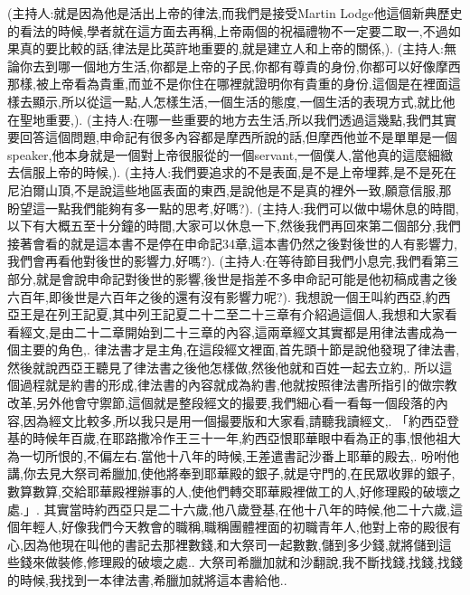 \documentclass{book}
\begin{document}
(主持人:就是因為他是活出上帝的律法,而我們是接受Martin Lodge他這個新典歷史的看法的時候,學者就在這方面去再稱,上帝兩個的祝福禮物不一定要二取一,不過如果真的要比較的話,律法是比英許地重要的,就是建立人和上帝的關係,).
(主持人:無論你去到哪一個地方生活,你都是上帝的子民,你都有尊貴的身份,你都可以好像摩西那樣,被上帝看為貴重,而並不是你住在哪裡就證明你有貴重的身份,這個是在裡面這樣去顯示,所以從這一點,人怎樣生活,一個生活的態度,一個生活的表現方式,就比他在聖地重要,).
(主持人:在哪一些重要的地方去生活,所以我們透過這幾點,我們其實要回答這個問題,申命記有很多內容都是摩西所說的話,但摩西他並不是單單是一個speaker,他本身就是一個對上帝很服從的一個servant,一個僕人,當他真的這麼細緻去信服上帝的時候,).
(主持人:我們要追求的不是表面,是不是上帝埋葬,是不是死在尼泊爾山頂,不是說這些地區表面的東西,是說他是不是真的裡外一致,願意信服,那盼望這一點我們能夠有多一點的思考,好嗎?).
(主持人:我們可以做中場休息的時間,以下有大概五至十分鐘的時間,大家可以休息一下,然後我們再回來第二個部分,我們接著會看的就是這本書不是停在申命記34章,這本書仍然之後對後世的人有影響力,我們會再看他對後世的影響力,好嗎?).
(主持人:在等待節目我們小息完,我們看第三部分,就是會說申命記對後世的影響,後世是指差不多申命記可能是他初稿成書之後六百年,即後世是六百年之後的還有沒有影響力呢?).
我想說一個王叫約西亞,約西亞王是在列王記夏,其中列王記夏二十二至二十三章有介紹過這個人,我想和大家看看經文,是由二十二章開始到二十三章的內容,這兩章經文其實都是用律法書成為一個主要的角色,.
律法書才是主角,在這段經文裡面,首先頭十節是說他發現了律法書,然後就說西亞王聽見了律法書之後他怎樣做,然後他就和百姓一起去立約,.
所以這個過程就是約書的形成,律法書的內容就成為約書,他就按照律法書所指引的做宗教改革,另外他會守禦節,這個就是整段經文的撮要,我們細心看一看每一個段落的內容,因為經文比較多,所以我只是用一個撮要版和大家看,請聽我讀經文,.
「約西亞登基的時候年百歲,在耶路撒冷作王三十一年,約西亞恨耶華眼中看為正的事,恨他祖大為一切所恨的,不偏左右.當他十八年的時候,王差遣書記沙番上耶華的殿去,.
吩咐他講,你去見大祭司希臘加,使他將奉到耶華殿的銀子,就是守門的,在民眾收罪的銀子,數算數算,交給耶華殿裡辦事的人,使他們轉交耶華殿裡做工的人,好修理殿的破壞之處.」.
其實當時約西亞只是二十六歲,他八歲登基,在他十八年的時候,他二十六歲,這個年輕人,好像我們今天教會的職稱,職稱團體裡面的初職青年人,他對上帝的殿很有心,因為他現在叫他的書記去那裡數錢,和大祭司一起數數,儲到多少錢,就將儲到這些錢來做裝修,修理殿的破壞之處..
大祭司希臘加就和沙翻說,我不斷找錢,找錢,找錢的時候,我找到一本律法書,希臘加就將這本書給他..
\end{document}
